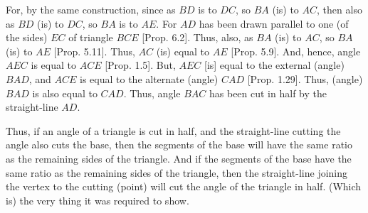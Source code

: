 \begin{Parallel}{}{}
{For, by the same construction, since as $BD$ is to $DC$, so $BA$ (is) to
$AC$, then also as $BD$ (is) to $DC$, so $BA$ is to $AE$. For $AD$ has been drawn
parallel to one (of the sides) $EC$ of triangle $BCE$ [Prop. 6.2]. Thus, also, as $BA$ (is) to $AC$,
so $BA$ (is) to $AE$  [Prop. 5.11]. Thus,
$AC$ (is) equal to $AE$ [Prop. 5.9].
And, hence, angle $AEC$ is equal to $ACE$  [Prop. 1.5]. But, 
$AEC$ [is] equal to the external (angle) $BAD$, and $ACE$ is equal to the alternate
(angle) $CAD$  [Prop. 1.29]. Thus, (angle) $BAD$ is
also equal to $CAD$. Thus, angle $BAC$ has been cut in half by the
straight-line $AD$.

Thus, if an angle of a triangle is cut in half, and the
straight-line cutting the angle also cuts the base, then the segments of the base
will have the same ratio as the remaining sides of the triangle. And if
the segments of the base have the same ratio as the remaining sides of the
triangle, then the straight-line joining the vertex to the cutting (point) will
cut the angle of the triangle in half. (Which is) the very thing it was required
to show.}
\end{Parallel}


\vspace{7pt}{\footnotesize \noindent$^\dag$ The fact that the
two straight-lines meet follows because the sum of $ACE$ and $CAE$
is less than two right-angles, as can easily be demonstrated. See Post.~5.}

